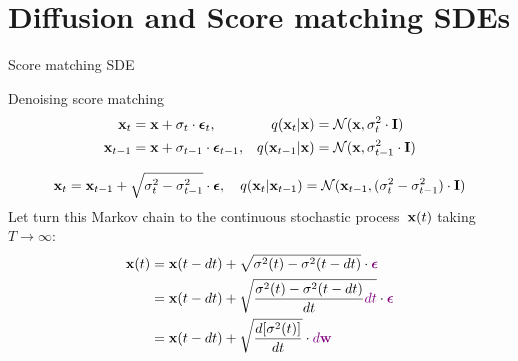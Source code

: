 \section{Diffusion and Score matching SDEs}
\begin{frame}{Score matching SDE}
	\vspace{-0.3cm}
	\begin{block}{Denoising score matching}
		\vspace{-0.7cm}
		\begin{align*}
			\mathbf{x}_t &= \mathbf{x} + \sigma_t \cdot \boldsymbol{\epsilon}_t, & q(\mathbf{x}_t | \mathbf{x}) &= \mathcal{N}(\mathbf{x}, \sigma_t^2 \cdot \mathbf{I}) \\
			\mathbf{x}_{t-1} &= \mathbf{x} + \sigma_{t-1} \cdot \boldsymbol{\epsilon}_{t-1}, & q(\mathbf{x}_{t-1} | \mathbf{x}) &= \mathcal{N}(\mathbf{x}, \sigma_{t-1}^2 \cdot \mathbf{I})
		\end{align*}
	\end{block}
	\vspace{-1.0cm}
	\[
		\mathbf{x}_t = \mathbf{x}_{t - 1} + \sqrt{\sigma^2_t - \sigma^2_{t-1}} \cdot \boldsymbol{\epsilon}, \quad q(\mathbf{x}_{t} | \mathbf{x}_{t-1}) = \mathcal{N}(\mathbf{x}_{t-1}, (\sigma_t^2 - \sigma_{t-1}^2) \cdot \mathbf{I})
	\]
	Let turn this Markov chain to the continuous stochastic process~$\mathbf{x}(t)$ taking $T \rightarrow \infty$:
	\vspace{-0.3cm}
	\begin{align*}
		\mathbf{x}(t) &= \mathbf{x}(t - dt) + \sqrt{\sigma^2(t) - \sigma^2(t - dt)} \cdot {\color{violet}\boldsymbol{\epsilon}} \\
		&= \mathbf{x}(t - dt) + \sqrt{\frac{\sigma^2(t) - \sigma^2(t - dt)}{dt} {\color{violet}dt}} \cdot {\color{violet}\boldsymbol{\epsilon}} \\
		&= \mathbf{x}(t - dt) + \sqrt{\frac{ d [\sigma^2(t)]}{dt}} \cdot {\color{violet}d \mathbf{w}}
	\end{align*}
	\vspace{-0.5cm}
\end{frame}
